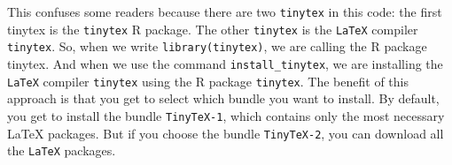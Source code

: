 \documentclass[
  letterpaper,
  paper =a4,
  twoside,
  openright,
  headsepline,
  footsepline,
  listof = totocnumbered,
  chapterprefix = true,
  firstiscover]{scrbook}
\begin{document}
This confuses some readers because there are two \texttt{tinytex} in
this code: the first tinytex is the \texttt{tinytex} R package. The
other \texttt{tinytex} is the \texttt{LaTeX} compiler \texttt{tinytex}.
So, when we write \texttt{library(tinytex)}, we are calling the R
package tinytex. And when we use the command \texttt{install\_tinytex},
we are installing the \texttt{LaTeX} compiler \texttt{tinytex} using the
R package \texttt{tinytex}. The benefit of this approach is that you get
to select which bundle you want to install. By default, you get to
install the bundle \texttt{TinyTeX-1}, which contains only the most
necessary LaTeX packages. But if you choose the bundle
\texttt{TinyTeX-2}, you can download all the \texttt{LaTeX} packages.


\backmatter
\end{document}
